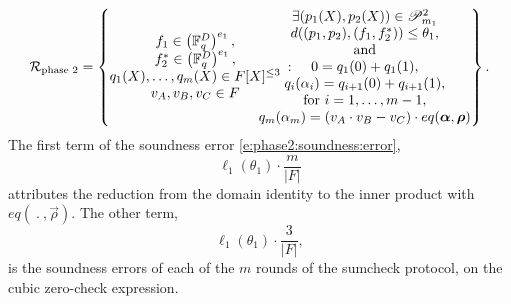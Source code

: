 \begin{equation}
\label{e:}
\mathcal R_\text{phase 2} =
\left\{
    \begin{matrix}
        f_1 \in \left(\mathbb F_q^{D}\right)^{e_1}, %
        \\
        f_2^* \in \left(\mathbb F_q^{D}\right)^{e_1}, %
        \\
        q_1(X), \ldots, q_m(X) \in F[X]^{\leq 3}
        \\
        v_A, v_B, v_C \in F
    \end{matrix}
    \::\:
    \hspace*{-10mm}
    \begin{matrix}
        \exists (p_1(X),p_2(X)) \in \mathscr P_{m_1}^2
        \\
        d((p_1,p_2), (f_1,f_2^*)) \leq \theta_1,
        \\\text{and}
        \\
        0 = q_1(0) + q_1(1),
        \\
        q_i(\alpha_i) = q_{i+1}(0) + q_{i+1}(1),
        \\
        \text{for }i = 1,\ldots, m-1,
        \\
        q_m(\alpha_m) = (v_A \cdot v_B - v_C)\cdot eq(\vec\alpha, \vec\rho)
    \end{matrix}
\right\}.
\end{equation}
The first term of the soundness error \eqref{e:phase2:soundness:error},
\[
\ell_1(\theta_1) \cdot \frac{m}{|F|}
\]
attributes the reduction from the domain identity to the inner product with $eq(\:.\:,\vec\rho)$.
The other term, 
\[
\ell_1(\theta_1)\cdot \frac{3}{|F|},
\]
is the soundness errors of each of the $m$ rounds of the sumcheck protocol, on the cubic zero-check expression.


